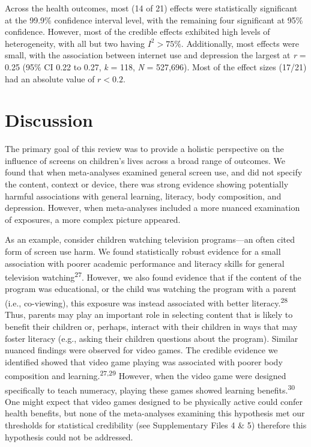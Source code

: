 \documentclass[
  english,
  man]{apa6}
\begin{document}
Across the health outcomes, most (14 of 21) effects were statistically significant at the 99.9\% confidence interval level, with the remaining four significant at 95\% confidence.
However, most of the credible effects exhibited high levels of heterogeneity, with all but two having \(I^2 > 75\%\).
Additionally, most effects were small, with the association between internet use and depression the largest at \emph{r} = 0.25 (95\% CI 0.22 to 0.27, \emph{k} = 118, \emph{N} = 527,696).
Most of the effect sizes (17/21) had an absolute value of \(r < 0.2\).

\hypertarget{discussion}{%
\section{Discussion}\label{discussion}}

The primary goal of this review was to provide a holistic perspective on the influence of screens on children's lives across a broad range of outcomes.
We found that when meta-analyses examined general screen use, and did not specify the content, context or device, there was strong evidence showing potentially harmful associations with general learning, literacy, body composition, and depression.
However, when meta-analyses included a more nuanced examination of exposures, a more complex picture appeared.

As an example, consider children watching television programs---an often cited form of screen use harm.
We found statistically robust evidence for a small association with poorer academic performance and literacy skills for general television watching\textsuperscript{27}.
However, we also found evidence that if the content of the program was educational, or the child was watching the program with a parent (i.e., co-viewing), this exposure was instead associated with better literacy.\textsuperscript{28}
Thus, parents may play an important role in selecting content that is likely to benefit their children or, perhaps, interact with their children in ways that may foster literacy (e.g., asking their children questions about the program).
Similar nuanced findings were observed for video games.
The credible evidence we identified showed that video game playing was associated with poorer body composition and learning.\textsuperscript{27,29}
However, when the video game were designed specifically to teach numeracy, playing these games showed learning benefits.\textsuperscript{30}
One might expect that video games designed to be physically active could confer health benefits, but none of the meta-analyses examining this hypothesis met our thresholds for statistical credibility (see Supplementary Files 4 \& 5) therefore this hypothesis could not be addressed.
\end{document}
